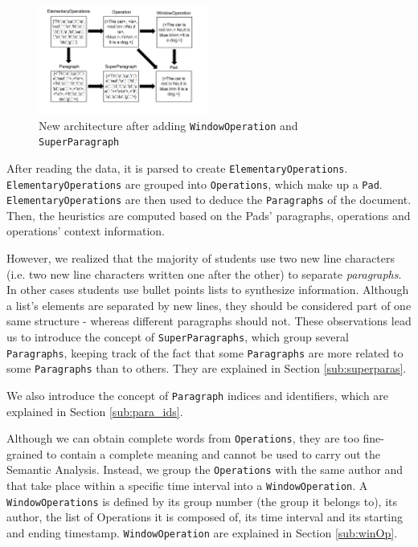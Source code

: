 \documentclass[twocolumn, 12pt]{article}
\begin{document}
    \begin{figure}[bhtp!]
        \centering
        \includegraphics[width=0.5\textwidth]{figures/architecture-new.png}
        \caption{New architecture after adding \texttt{WindowOperation} and \texttt{SuperParagraph}}
        \label{Architecture_new}
    \end{figure}
  
  \newpage
  After reading the data, it is parsed to create \texttt{ElementaryOperations}. \texttt{ElementaryOperations} are grouped into \texttt{Operations}, which make up a \texttt{Pad}. \texttt{ElementaryOperations} are then used to deduce the \texttt{Paragraphs} of the document. Then, the heuristics are computed based on the Pads' paragraphs, operations and operations' context information.
  
  However, we realized that the majority of students use two new line characters (i.e. two new line characters written one after the other) to separate \textit{paragraphs}. In other cases students use  bullet points lists to synthesize information. Although a list's elements are separated by new lines, they should be considered part of one same structure - whereas different paragraphs should not. These observations lead us to introduce the concept of \texttt{SuperParagraphs}, which group several \texttt{Paragraphs}, keeping track of the fact that some \texttt{Paragraphs} are more related to some \texttt{Paragraphs} than to others. They are explained in Section \ref{sub:superparas}.

  We also introduce the concept of \texttt{Paragraph} indices and identifiers, which are explained in Section \ref{sub:para_ids}.
  
  Although we can obtain complete words from \texttt{Operations}, they are too fine-grained to contain a complete meaning and cannot be used to carry out the Semantic Analysis. Instead, we group the \texttt{Operations} with the same author and that take place within a specific time interval into a \texttt{WindowOperation}. A \texttt{WindowOperations} is defined by its group number (the group it belongs to), its author, the list of Operations it is composed of, its time interval and its starting and ending timestamp. \texttt{WindowOperation} are explained in Section \ref{sub:winOp}.
\end{document}
